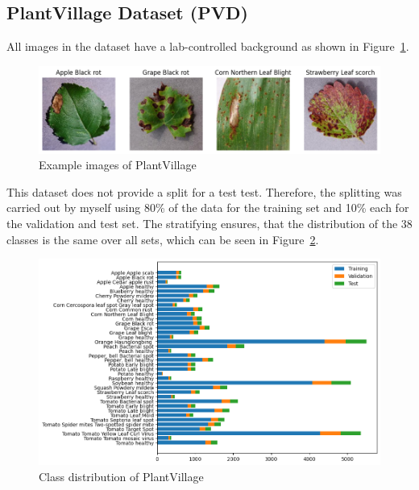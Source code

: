 \subsection{PlantVillage Dataset (PVD)}
All images in the dataset have a lab-controlled background as shown in Figure~\ref{fig:example_images_of_plantvillage}.

\begin{figure}[H]
    \begin{center}
    \includegraphics[width=15cm]{../images/example_images_of_plantvillage.png}
    \caption{Example images of PlantVillage}
   \label{fig:example_images_of_plantvillage}
    \end{center}
\end{figure}

This dataset does not provide a split for a test test. Therefore, the splitting was carried out by myself using 80\% of the data for the training set and 10\% each for the validation and test set. The stratifying ensures, that the distribution of the 38 classes is the same over all sets, which can be seen in Figure~\ref{fig:class_distribution_of_plantvillage}. 

\begin{figure}[H]
    \begin{center}
    \includegraphics[width=15cm]{../images/class_distribution_of_plantvillage.png}
    \caption{Class distribution of PlantVillage}
   \label{fig:class_distribution_of_plantvillage}
    \end{center}
\end{figure}

